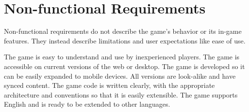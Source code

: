 \section{Non-functional Requirements}

Non-functional requirements do not describe the game's behavior or its in-game features.
They instead describe limitations and user expectations like ease of use.

\begin{enumerate}[label=\textbf{N\arabic*}, ref=N\arabic*]
     The game is easy to understand and use by inexperienced players.
     The game is accessible on current versions of the web or desktop.
    The game is developed so it can be easily expanded to mobile devices.
    All versions are look-alike and have synced content.
     The game code is written clearly, with the appropriate architecture and conventions so that it is easily extensible.
     The game supports English and is ready to be extended to other languages.
\end{enumerate}

\blind[2] 